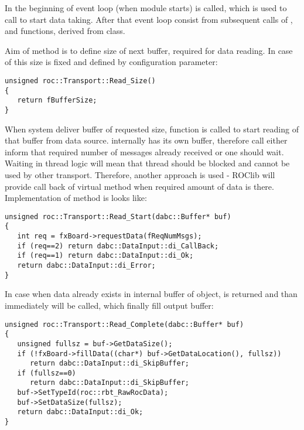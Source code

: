 In the beginning of event loop (when module starts)  is called, which
is used to call  to start data taking. After that
event loop consist from subsequent calls of ,  and 
functions, derived from  class. 

Aim of  method is to define size of next buffer, required for data reading. 
In case of  this size
is fixed and defined by configuration parameter:  

\begin{verbatim}
unsigned roc::Transport::Read_Size()
{
   return fBufferSize;
}
\end{verbatim}
    
When system deliver buffer of requested size,  function is called to start reading 
of that buffer from data source.  internally has its own buffer, therefore call 
 either inform that required number of messages already received or
one should wait. Waiting in thread logic will mean that thread should be blocked and 
cannot be used by other transport. Therefore, another approach is used - ROClib will provide 
call back of virtual  method when required amount of data is there.
Implementation of method is looks like:

\begin{verbatim}
unsigned roc::Transport::Read_Start(dabc::Buffer* buf)
{
   int req = fxBoard->requestData(fReqNumMsgs);
   if (req==2) return dabc::DataInput::di_CallBack;
   if (req==1) return dabc::DataInput::di_Ok;
   return dabc::DataInput::di_Error;
}
\end{verbatim}

In case when data already exists in internal buffer of  object,  
is returned and than immediately  will be called, which finally fill output buffer:

\begin{verbatim}
unsigned roc::Transport::Read_Complete(dabc::Buffer* buf)
{
   unsigned fullsz = buf->GetDataSize();
   if (!fxBoard->fillData((char*) buf->GetDataLocation(), fullsz)) 
      return dabc::DataInput::di_SkipBuffer;
   if (fullsz==0) 
      return dabc::DataInput::di_SkipBuffer;
   buf->SetTypeId(roc::rbt_RawRocData);
   buf->SetDataSize(fullsz);
   return dabc::DataInput::di_Ok;
}
\end{verbatim}


